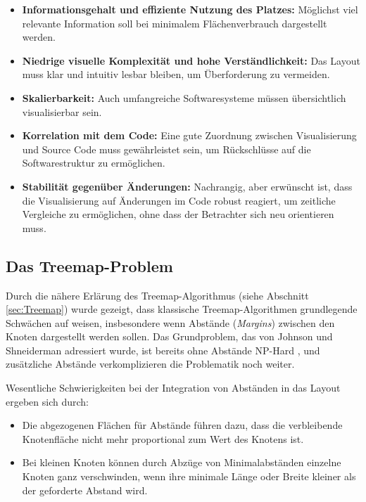 \begin{itemize}
    \item \textbf{Informationsgehalt und effiziente Nutzung des Platzes:} Möglichst viel relevante Information soll bei minimalem Flächenverbrauch dargestellt werden.
    \item \textbf{Niedrige visuelle Komplexität und hohe Verständlichkeit:} Das Layout muss klar und intuitiv lesbar bleiben, um Überforderung zu vermeiden.
    \item \textbf{Skalierbarkeit:} Auch umfangreiche Softwaresysteme müssen übersichtlich visualisierbar sein.
    \item \textbf{Korrelation mit dem Code:} Eine gute Zuordnung zwischen Visualisierung und Source Code muss gewährleistet sein, um Rückschlüsse auf die Softwarestruktur zu ermöglichen.
    \item \textbf{Stabilität gegenüber Änderungen:} Nachrangig, aber erwünscht ist, dass die Visualisierung auf Änderungen im Code robust reagiert, um zeitliche Vergleiche zu ermöglichen, ohne dass der Betrachter sich neu orientieren muss.
\end{itemize}

\subsection{Das Treemap-Problem} \label{sec:TreemapProblem}

Durch die nähere Erlärung des Treemap-Algorithmus (siehe Abschnitt \ref{sec:Treemap}) wurde gezeigt, dass klassische Treemap-Algorithmen grundlegende Schwächen auf weisen, insbesondere wenn Abstände (\textit{Margins}) zwischen den Knoten dargestellt werden sollen. Das Grundproblem, das von Johnson und Shneiderman \cite{johnson1991tree} adressiert wurde, ist bereits ohne Abstände NP-Hard \cite[3]{bruls2000squarified}, und zusätzliche Abstände verkomplizieren die Problematik noch weiter.

Wesentliche Schwierigkeiten bei der Integration von Abständen in das Layout ergeben sich durch:
\begin{itemize}
    \item Die abgezogenen Flächen für Abstände führen dazu, dass die verbleibende Knotenfläche nicht mehr proportional zum Wert des Knotens ist.
    \item Bei kleinen Knoten können durch Abzüge von Minimalabständen einzelne Knoten ganz verschwinden, wenn ihre minimale Länge oder Breite kleiner als der geforderte Abstand wird.
\end{itemize}

